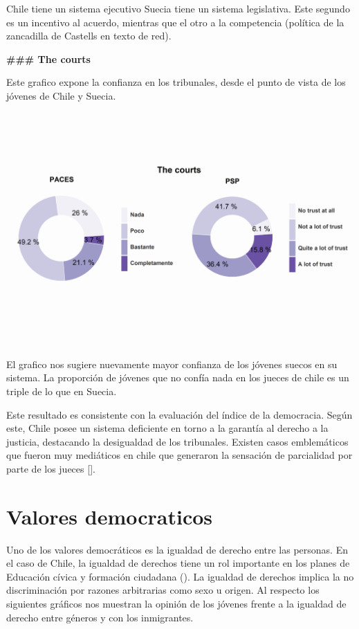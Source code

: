 \documentclass[12pt,twoside]{templates/facsothesis}
\begin{document}
Chile tiene un sistema ejecutivo Suecia tiene un sistema legislativa. Este segundo es un incentivo al acuerdo, mientras que el otro a la competencia (política de la zancadilla de Castells en texto de red).

\textbf{\#\#\# The courts}

Este grafico expone la confianza en los tribunales, desde el punto de vista de los jóvenes de Chile y Suecia.

\includegraphics{output/plotru3.png}

El grafico nos sugiere nuevamente mayor confianza de los jóvenes suecos en su sistema. La proporción de jóvenes que no confía nada en los jueces de chile es un triple de lo que en Suecia.

Este resultado es consistente con la evaluación del índice de la democracia. Según este, Chile posee un sistema deficiente en torno a la garantía al derecho a la justicia, destacando la desigualdad de los tribunales. Existen casos emblemáticos que fueron muy mediáticos en chile que generaron la sensación de parcialidad por parte de los jueces {[}{]}.

\hypertarget{valores-democraticos-1}{%
\section{Valores democraticos}\label{valores-democraticos-1}}

Uno de los valores democráticos es la igualdad de derecho entre las personas. En el caso de Chile, la igualdad de derechos tiene un rol importante en los planes de Educación cívica y formación ciudadana (). La igualdad de derechos implica la no discriminación por razones arbitrarias como sexo u origen. Al respecto los siguientes gráficos nos muestran la opinión de los jóvenes frente a la igualdad de derecho entre géneros y con los inmigrantes.
\end{document}
